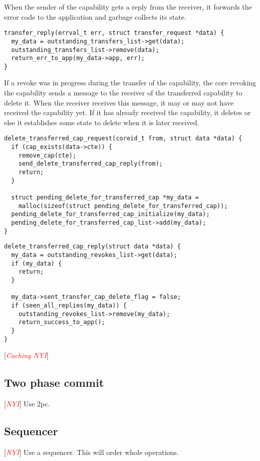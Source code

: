 \documentclass[a4paper,twoside]{report} %
\newcommand{\note}[1]{[\textcolor{red}{\textit{#1}}]}
\begin{document}
When the sender of the capability gets a reply from the receiver, it
forwards the error code to the application and garbage collects its
state.

\begin{verbatim}
transfer_reply(errval_t err, struct transfer_request *data) {
  my_data = outstanding_transfers_list->get(data);
  outstanding_transfers_list->remove(data);
  return_err_to_app(my_data->app, err);
}
\end{verbatim}

If a revoke was in progress during the transfer of the capability, the
core revoking the capability sends a message to the receiver of the
transferred capability to delete it. When the receiver receives this
message, it may or may not have received the capability yet. If it has
already received the capability, it deletes or else it establishes
some state to delete when it is later received.

\begin{verbatim}
delete_transferred_cap_request(coreid_t from, struct data *data) {
  if (cap_exists(data->cte)) {
    remove_cap(cte);
    send_delete_transferred_cap_reply(from);
    return;
  }

  struct pending_delete_for_transferred_cap *my_data =
    malloc(sizeof(struct pending_delete_for_transferred_cap));
  pending_delete_for_transferred_cap_initialize(my_data);
  pending_delete_for_transferred_cap_list->add(my_data);
}
\end{verbatim}

\begin{verbatim}
delete_transferred_cap_reply(struct data *data) {
  my_data = outstanding_revokes_list->get(data);
  if (my_data) {
    return;
  }

  my_data->sent_transfer_cap_delete_flag = false;
  if (seen_all_replies(my_data)) {
    outstanding_revokes_list->remove(my_data);
    return_success_to_app();
  }
}
\end{verbatim}

\note{Caching NYI}

\subsection{Two phase commit}
\note{NYI}
Use 2pc.

\subsection{Sequencer}
\note{NYI}
Use a sequencer. This will order whole operations.
\end{document}
